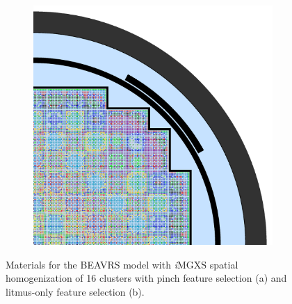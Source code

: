 \begin{figure}[h!]
\begin{subfigure}{0.67\textwidth}
  \includegraphics[width=\linewidth]{figures/unsupervised/geometries/with-features/16-clusters/combined/full-core}
  \caption{}
  \label{fig:chap10-full-core-combined-16}
\end{subfigure}
\caption[Materials for BEAVRS with \textit{i}\ac{MGXS} homogenization (16 clusters)]{Materials for the \ac{BEAVRS} model with \textit{i}\ac{MGXS} spatial homogenization of 16 clusters with pinch feature selection (a) and litmus-only feature selection (b).}
\label{fig:chap10-full-core-geometries-16}
\end{figure}

\clearpage

